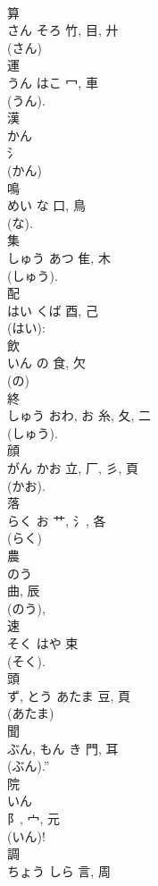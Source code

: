 \documentclass[8pt]{extreport}
\begin{document}
\begin{CJK}{UTF8}{min}
\\	算	
\\	さん	そろ	竹, 目, 廾	
\\	(さん) 
\\	運	
\\	うん	はこ	冖, 車		
\\	(うん). 
\\	漢	
\\	かん	
\\	氵		
\\	(かん) 
\\	鳴	
\\	めい	な	口, 鳥	
\\	(な). 
\\	集	
\\	しゅう	あつ	隹, 木	
\\	(しゅう). 
\\	配	
\\	はい	くば	酉, 己	
\\	(はい): 
\\	飲	
\\	いん	の	食, 欠	
\\	(の) 
\\	終	
\\	しゅう	おわ, お	糸, 夂, 二	
\\	(しゅう). 
\\	顔	
\\	がん	かお	立, 厂, 彡, 頁	
\\	(かお). 
\\	落	
\\	らく	お	艹, 氵, 各	
\\	(らく) 
\\	農	
\\	のう	
\\	曲, 辰	
\\	(のう), 
\\	速	
\\	そく	はや	束		
\\	(そく). 
\\	頭	
\\	ず, とう	あたま	豆, 頁	
\\	(あたま) 
\\	聞	
\\	ぶん, もん	き	門, 耳	
\\	(ぶん).” 
\\	院	
\\	いん	
\\	阝, 宀, 元	
\\	(いん)!	
\\	調	
\\	ちょう	しら	言, 周	

\end{CJK}
\end{document}
